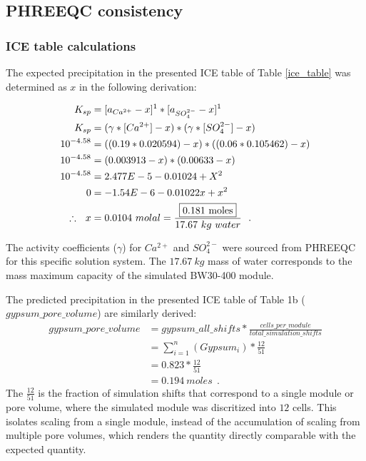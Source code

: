 \begin{supplementary}
\subsection{PHREEQC consistency}

\subsubsection{ICE table calculations}
The expected precipitation in the presented ICE table of Table \ref{ice_table} was determined as $x$ in the following derivation:

\begin{equation} \label{ice_calculations}
    \begin{split}
        K_{sp} &= [a_{Ca^{2+}} - x]^1 * [a_{SO_4^{2-}} - x]^1 \\ 
        K_{sp} &= (\gamma*[Ca^{2+}] - x) * (\gamma*[SO_4^{2-}] - x) \\ 
        10^{-4.58} &= ((0.19*0.020594) - x) * ((0.06*0.105462) - x) \\ 
        10^{-4.58} &= (0.003913 - x) * (0.00633 - x) \\
        10^{-4.58} &= 2.477E-5 - 0.01024 + X^2 \\
        0 &= -1.54E-6 - 0.01022x + x^2 \\
         \therefore ~~ x &= 0.0104~molal = \frac{\fbox{0.181~moles}}{17.67~kg~water}~~.
    \end{split}
\end{equation}

The activity coefficients ($\gamma$) for $Ca^{2+}$ and $SO_4^{2-}$ were sourced from PHREEQC for this specific solution system. The $17.67~kg$ mass of water corresponds to the mass maximum capacity of the simulated BW30-400 module.  

The predicted precipitation in the presented ICE table of Table 1b ($gypsum\_pore\_volume$) are similarly derived:
\begin{equation} \label{PHREEQC_output_precipitation}
    \begin{split}
        gypsum\_pore\_volume &= gypsum\_all\_shifts * \frac{cells\_per\_module}{total\_simulation\_shifts} \\
         &= \sum_{i=1}^n (Gypsum_i) * \frac{12}{51} \\ 
         &= 0.823 * \frac{12}{51} \\ 
         &= 0.194 ~moles ~~.
    \end{split}
\end{equation}
The $\frac{12}{51}$ is the fraction of simulation shifts that correspond to a single module or pore volume, where the simulated module was discritized into $12$ cells. This isolates scaling from a single module, instead of the accumulation of scaling from multiple pore volumes, which renders the quantity directly comparable with the expected quantity.


\end{supplementary}
